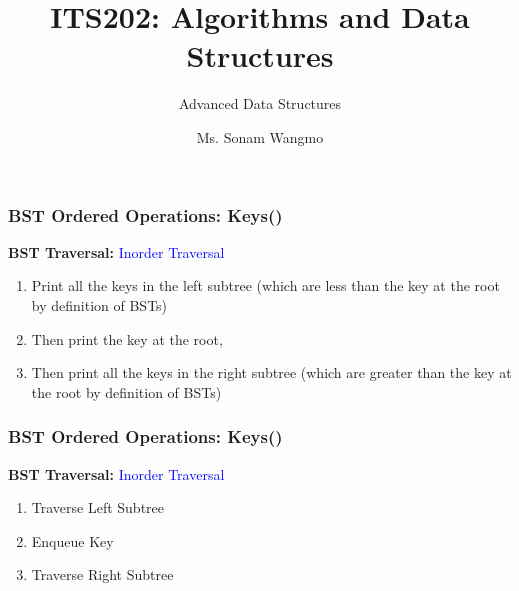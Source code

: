 \documentclass[11pt]{beamer}
\begin{document}
	\author{Ms. Sonam Wangmo}
	\title{ITS202: Algorithms and Data Structures}
	\subtitle{Advanced Data Structures}
	\institute{
		\textcolor{blue}{Gyalpozhing College of Information Technology \\ Royal University of Bhutan} \\
		\vspace{0.5cm}
	}
	\begin{frame}[plain]
		\maketitle
	\end{frame}

	\begin{frame}
		\frametitle{BST Ordered Operations: Keys()}
	      \textbf{BST Traversal: }\textcolor{blue}{Inorder Traversal}
	      \begin{enumerate}
	      	\item Print all the keys in the left subtree (which are less than the key at the root by definition of BSTs)
	      	\item Then print the key at the root,
	      	\item Then print all the keys in the right subtree (which are greater than the key at the root by definition of BSTs)
	      \end{enumerate}
	\end{frame}	

    \begin{frame}
    	\frametitle{BST Ordered Operations: Keys()}
    	\textbf{BST Traversal: }\textcolor{blue}{Inorder Traversal}
    	\begin{enumerate}
    		\item Traverse Left Subtree
    		\item Enqueue Key 
    		\item Traverse Right Subtree
    	\end{enumerate}
    \end{frame}	
    
\end{document}

